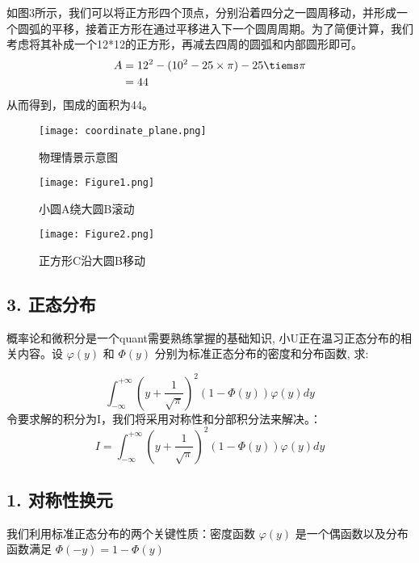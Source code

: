 \documentclass[UTF8]{ctexart}
\begin{document}
如图3所示，我们可以将正方形四个顶点，分别沿着四分之一圆周移动，并形成一个圆弧的平移，接着正方形在通过平移进入下一个圆周周期。为了简便计算，我们考虑将其补成一个12*12的正方形，再减去四周的圆弧和内部圆形即可。
$$
\begin{align}
    A &= 12^2 - (10^2-25\times \pi) -  25\tiems \pi\\
    &= 44 \\
\end{align}
$$
从而得到，围成的面积为44。
\begin{figure}[h!]
    \centering
    \texttt{[image: coordinate\_plane.png]}
    \caption{物理情景示意图}
    \label{fig:fig3}
\end{figure}


\begin{figure}[h!]
    \centering
    \begin{minipage}{0.45\textwidth}
        \centering
        \texttt{[image: Figure1.png]} 
        \caption{小圆A绕大圆B滚动}
        \label{fig:fig1}
    \end{minipage}\hfill
    \begin{minipage}{0.45\textwidth}
        \centering
        \texttt{[image: Figure2.png]}
        \caption{正方形C沿大圆B移动}
        \label{fig:fig2}
    \end{minipage}
\end{figure}


\subsection*{3. 正态分布}
概率论和微积分是一个quant需要熟练掌握的基础知识, 小U正在温习正态分布的相关内容。设 $\varphi(y)$ 和 $\Phi(y)$ 分别为标准正态分布的密度和分布函数, 求:

$$\int_{-\infty}^{+\infty}{\left(y+\frac{1}{\sqrt{\pi}}\right)^{2}(1-\Phi(y))\varphi
  (y)dy}$$
令要求解的积分为I，我们将采用对称性和分部积分法来解决。：
$$ I = \int_{-\infty}^{+\infty}{\left(y+\frac{1}{\sqrt{\pi}}\right)^{2}(1-\Phi(y))\varphi(y)dy} $$

\subsection*{1. 对称性换元}
我们利用标准正态分布的两个关键性质：密度函数 $\varphi(y)$ 是一个偶函数以及分布函数满足 $\Phi(-y) = 1 - \Phi(y)$
\end{document}
